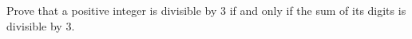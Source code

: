 Prove that a positive integer is divisible by $3$ if and only if the sum of its digits is divisible by $3$.
